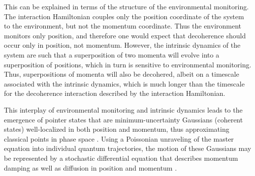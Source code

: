 \documentclass[3p,sort&compress]{elsarticle}
\begin{document}
This can be explained in terms of the structure of the environmental monitoring. The interaction Hamiltonian couples only the position coordinate of the system to the environment, but not the momentum coordinate. Thus the environment monitors only position, and therefore one would expect that decoherence should occur only in position, not momentum. However, the intrinsic dynamics of the system are such that a superposition of two momenta will evolve into a superposition of positions, which in turn is sensitive to environmental monitoring. Thus, superpositions of momenta will also be decohered, albeit on a timescale associated with the intrinsic dynamics, which  is much longer than the timescale for the decoherence interaction described by the interaction Hamiltonian. 

This interplay of environmental monitoring and intrinsic dynamics leads to the emergence of pointer states that are minimum-uncertainty Gaussians (coherent states) well-localized in both position and momentum, thus approximating classical points in phase space \cite{Kubler:1973:ux,Paz:1993:ta,Zurek:1993:pu,Zurek:2002:ii,Diosi:2000:yn,Joos:2003:jh,Eisert:2003:ib,Sorgel:2015:pp}. Using a Poissonian unraveling of the master equation into individual quantum trajectories, the motion of these Gaussians may be represented by a stochastic differential equation that describes momentum damping as well as diffusion in position and momentum \cite{Sorgel:2015:pp}. 
\end{document}
